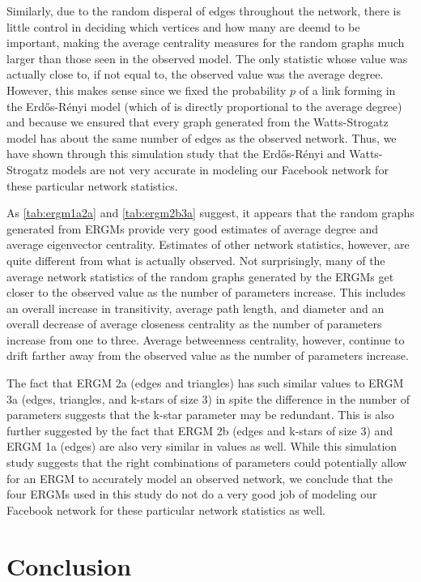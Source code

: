 \documentclass[12pt,twoside]{amherstthesis}
\begin{document}
  Similarly, due to the random disperal of edges throughout the network,
  there is little control in deciding which vertices and how many are
  deemd to be important, making the average centrality measures for the
  random graphs much larger than those seen in the observed model. The
  only statistic whose value was actually close to, if not equal to, the
  observed value was the average degree. However, this makes sense since
  we fixed the probability \(p\) of a link forming in the Erdős-Rényi
  model (which of is directly proportional to the average degree) and
  because we ensured that every graph generated from the Watts-Strogatz
  model has about the same number of edges as the observed network. Thus,
  we have shown through this simulation study that the Erdős-Rényi and
  Watts-Strogatz models are not very accurate in modeling our Facebook
  network for these particular network statistics.
  
  As \autoref{tab:ergm1a2a} and \autoref{tab:ergm2b3a} suggest, it appears
  that the random graphs generated from ERGMs provide very good estimates
  of average degree and average eigenvector centrality. Estimates of other
  network statistics, however, are quite different from what is actually
  observed. Not surprisingly, many of the average network statistics of
  the random graphs generated by the ERGMs get closer to the observed
  value as the number of parameters increase. This includes an overall
  increase in transitivity, average path length, and diameter and an
  overall decrease of average closeness centrality as the number of
  parameters increase from one to three. Average betweenness centrality,
  however, continue to drift farther away from the observed value as the
  number of parameters increase.
  
  The fact that ERGM 2a (edges and triangles) has such similar values to
  ERGM 3a (edges, triangles, and k-stars of size \(3\)) in spite the
  difference in the number of parameters suggests that the k-star
  parameter may be redundant. This is also further suggested by the fact
  that ERGM 2b (edges and k-stars of size \(3\)) and ERGM 1a (edges) are
  also very similar in values as well. While this simulation study
  suggests that the right combinations of parameters could potentially
  allow for an ERGM to accurately model an observed network, we conclude
  that the four ERGMs used in this study do not do a very good job of
  modeling our Facebook network for these particular network statistics as
  well.
  
  \chapter{Conclusion}\label{conclusion}
  
\end{document}
